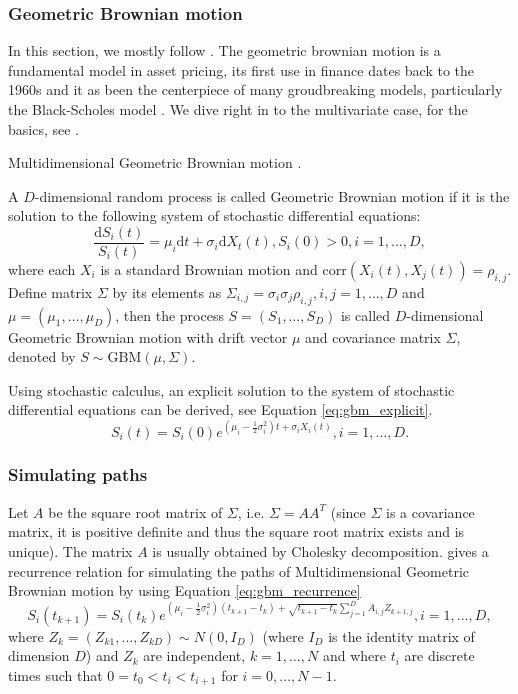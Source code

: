 \subsubsection{Geometric Brownian motion}
In this section, we mostly follow \cite[Section 3.2.3.]{glasserman2004monte}. The geometric brownian motion is a fundamental model in asset pricing, its first use in finance dates back to the 1960s and it as been the centerpiece of many groudbreaking models, particularly the Black-Scholes model \cite{black_scholes}. We dive right in to the multivariate case, for the basics, see \cite[Section 3.2.]{glasserman2004monte}.
\begin{defn}{Multidimensional Geometric Brownian motion \cite[p. 104]{glasserman2004monte}.}

A $D$-dimensional random process is called Geometric Brownian motion if it is the solution to the following system of stochastic differential equations:
\begin{equation}
\frac{\mathrm{d} S_i(t)}{S_i(t)}=\mu_i \mathrm{d}t + \sigma_i \mathrm{d}X_t(t), S_i(0)>0, i=1,\dots,D,
\end{equation}
where each $X_i$ is a standard Brownian motion and $\mathrm{corr}(X_i(t),X_j(t))=\rho_{i,j}$. Define matrix $\Sigma$ by its elements as $\Sigma_{i,j}=\sigma_i\sigma_j\rho_{i,j}, i, j = 1,\dots,D$ and $\mu=(\mu_1,\dots,\mu_D)$, then the process $S=(S_1,\dots,S_D)$ is called $D$-dimensional Geometric Brownian motion with drift vector $\mu$ and covariance matrix $\Sigma$, denoted by $S\sim\mathrm{GBM}(\mu, \Sigma)$.
\end{defn}
Using stochastic calculus, an explicit solution to the system of stochastic differential equations can be derived, see Equation \ref{eq:gbm_explicit}.
\begin{equation}
\label{eq:gbm_explicit}
S_i(t)=S_i(0)e^{(\mu_i-\frac{1}{2}\sigma_i^2)t+\sigma_iX_i(t)},i=1,\dots,D.
\end{equation}
\subsubsection{Simulating paths}
Let $A$ be the square root matrix of $\Sigma$, i.e. $\Sigma=AA^T$ (since $\Sigma$ is a covariance matrix, it is positive definite and thus the square root matrix exists and is unique).	 The matrix $A$ is usually obtained by Cholesky decomposition. \cite[Section 3.2.3.]{glasserman2004monte} gives a recurrence relation for simulating the paths of Multidimensional Geometric Brownian motion by using Equation \ref{eq:gbm_recurrence}
\begin{equation}
\label{eq:gbm_recurrence}
S_i(t_{k+1})=S_i(t_k)e^{(\mu_i-\frac{1}{2}\sigma_i^2)(t_{k+1}-t_k)+\sqrt{t_{k+1}-t_k}\sum_{j=1}^DA_{i,j}Z_{k+1,j}},i=1,\dots,D,
\end{equation}
where $Z_k=(Z_{k1},\dots,Z_{kD})\sim N(0,I_D)$ (where $I_D$ is the identity matrix of dimension $D$) and $Z_k$ are independent, $k=1,\dots,N$ and where $t_{i}$ are discrete times such that $0=t_0<t_{i}<t_{i+1}$ for $i=0,\dots,N-1$.
